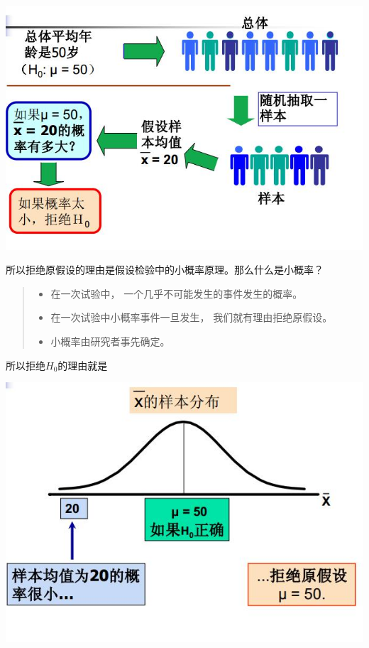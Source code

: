 \documentclass[]{ctexbook}
\providecommand{\tightlist}{%
  \setlength{\itemsep}{0pt}\setlength{\parskip}{0pt}}
\begin{document}
\includegraphics[width=1\linewidth,height=0.35\textheight]{fig/fig10}

所以拒绝原假设的理由是假设检验中的小概率原理。那么什么是小概率？

\begin{quote}
\begin{itemize}
\tightlist
\item
  在一次试验中， 一个几乎不可能发生的事件发生的概率。
\item
  在一次试验中小概率事件一旦发生， 我们就有理由拒绝原假设。
\item
  小概率由研究者事先确定。
\end{itemize}
\end{quote}

所以拒绝\(H_0\)的理由就是

\includegraphics[width=1\linewidth,height=0.35\textheight]{fig/fig11}
\end{document}
